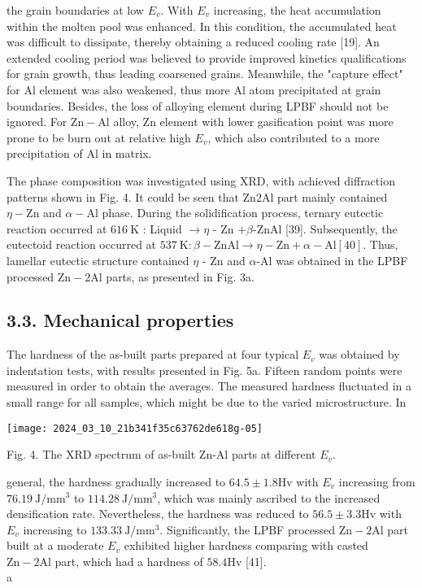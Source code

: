 \documentclass[10pt]{article}
\begin{document}
the grain boundaries at low $E_{v}$. With $E_{v}$ increasing, the heat accumulation within the molten pool was enhanced. In this condition, the accumulated heat was difficult to dissipate, thereby obtaining a reduced cooling rate [19]. An extended cooling period was believed to provide improved kinetics qualifications for grain growth, thus leading coarsened grains. Meanwhile, the "capture effect" for Al element was also weakened, thus more $\mathrm{Al}$ atom precipitated at grain boundaries. Besides, the loss of alloying element during LPBF should not be ignored. For $\mathrm{Zn}-\mathrm{Al}$ alloy, $\mathrm{Zn}$ element with lower gasification point was more prone to be burn out at relative high $E_{v}$, which also contributed to a more precipitation of $\mathrm{Al}$ in matrix.

The phase composition was investigated using XRD, with achieved diffraction patterns shown in Fig. 4. It could be seen that Zn$2 \mathrm{Al}$ part mainly contained $\eta-\mathrm{Zn}$ and $\alpha-\mathrm{Al}$ phase. During the solidification process, ternary eutectic reaction occurred at $616 \mathrm{~K}$ : Liquid $\rightarrow \eta$ - Zn $+\beta$-ZnAl [39]. Subsequently, the eutectoid reaction occurred at $537 \mathrm{~K}: \beta-\mathrm{ZnAl} \rightarrow \eta-\mathrm{Zn}+\alpha-\mathrm{Al}[40]$. Thus, lamellar eutectic structure contained $\eta$ - $\mathrm{Zn}$ and $\alpha$-Al was obtained in the LPBF processed $\mathrm{Zn}-2 \mathrm{Al}$ parts, as presented in Fig. 3a.

\subsection*{3.3. Mechanical properties}
The hardness of the as-built parts prepared at four typical $E_{v}$ was obtained by indentation tests, with results presented in Fig. 5a. Fifteen random points were measured in order to obtain the averages. The measured hardness fluctuated in a small range for all samples, which might be due to the varied microstructure. In

\begin{center}
\texttt{[image: 2024\_03\_10\_21b341f35c63762de618g-05]}
\end{center}

Fig. 4. The XRD spectrum of as-built Zn-Al parts at different $E_{v}$.

general, the hardness gradually increased to $64.5 \pm 1.8 \mathrm{Hv}$ with $E_{v}$ increasing from $76.19 \mathrm{~J} / \mathrm{mm}^{3}$ to $114.28 \mathrm{~J} / \mathrm{mm}^{3}$, which was mainly ascribed to the increased densification rate. Nevertheless, the hardness was reduced to $56.5 \pm 3.3 \mathrm{Hv}$ with $E_{v}$ increasing to $133.33 \mathrm{~J} / \mathrm{mm}^{3}$. Significantly, the LPBF processed $\mathrm{Zn}-2 \mathrm{Al}$ part built at a moderate $E_{v}$ exhibited higher hardness comparing with casted $\mathrm{Zn}-2 \mathrm{Al}$ part, which had a hardness of $58.4 \mathrm{Hv}$ [41].\\
a
\end{document}
